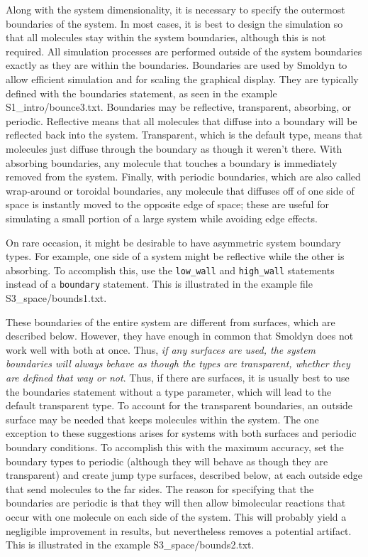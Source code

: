 \documentclass {book}
\newcommand {\ttt} {\texttt}
\begin{document}
Along with the system dimensionality, it is necessary to specify the outermost boundaries of the system. In most cases, it is best to design the simulation so that all molecules stay within the system boundaries, although this is not required. All simulation processes are performed outside of the system boundaries exactly as they are within the boundaries. Boundaries are used by Smoldyn to allow efficient simulation and for scaling the graphical display. They are typically defined with the boundaries statement, as seen in the example S1\_intro/bounce3.txt. Boundaries may be reflective, transparent, absorbing, or periodic. Reflective means that all molecules that diffuse into a boundary will be reflected back into the system. Transparent, which is the default type, means that molecules just diffuse through the boundary as though it weren't there. With absorbing boundaries, any molecule that touches a boundary is immediately removed from the system. Finally, with periodic boundaries, which are also called wrap-around or toroidal boundaries, any molecule that diffuses off of one side of space is instantly moved to the opposite edge of space; these are useful for simulating a small portion of a large system while avoiding edge effects.

On rare occasion, it might be desirable to have asymmetric system boundary types. For example, one side of a system might be reflective while the other is absorbing. To accomplish this, use the \ttt{low\_wall} and \ttt{high\_wall} statements instead of a \ttt{boundary} statement. This is illustrated in the example file S3\_space/bounds1.txt.

These boundaries of the entire system are different from surfaces, which are described below. However, they have enough in common that Smoldyn does not work well with both at once. Thus, \textit{if any surfaces are used, the system boundaries will always behave as though the types are transparent, whether they are defined that way or not}. Thus, if there are surfaces, it is usually best to use the boundaries statement without a type parameter, which will lead to the default transparent type. To account for the transparent boundaries, an outside surface may be needed that keeps molecules within the system. The one exception to these suggestions arises for systems with both surfaces and periodic boundary conditions. To accomplish this with the maximum accuracy, set the boundary types to periodic (although they will behave as though they are transparent) and create jump type surfaces, described below, at each outside edge that send molecules to the far sides. The reason for specifying that the boundaries are periodic is that they will then allow bimolecular reactions that occur with one molecule on each side of the system. This will probably yield a negligible improvement in results, but nevertheless removes a potential artifact. This is illustrated in the example S3\_space/bounds2.txt.
\end{document}
